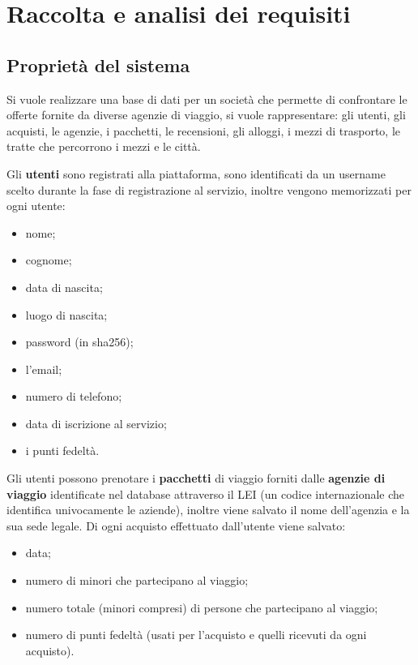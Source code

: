 \section{Raccolta e analisi dei requisiti}
\subsection{Proprietà del sistema}
%
%
Si vuole realizzare una base di dati per un società che permette di confrontare le offerte fornite da diverse agenzie di viaggio, si vuole rappresentare: gli utenti, gli acquisti, le agenzie, i pacchetti, le recensioni, gli alloggi, i mezzi di trasporto, le tratte che percorrono i mezzi e le città.

%
%
Gli \textbf{utenti} sono registrati alla piattaforma, sono identificati da un username scelto durante la fase di registrazione al servizio, inoltre vengono memorizzati per ogni utente:
\begin{multicols}{2}
\begin{itemize}
    \item nome;
    \item cognome;
    \item data di nascita;
    \item luogo di nascita;
    \item password (in sha256);
    \item l'email;
    \item numero di telefono;
    \item data di iscrizione al servizio;
    \item i punti fedeltà.
\end{itemize}
\end{multicols}
%
%
Gli utenti possono prenotare i \textbf{pacchetti} di viaggio forniti dalle \textbf{agenzie di viaggio} identificate nel database attraverso il LEI (un codice internazionale che identifica univocamente le aziende), inoltre viene salvato il nome dell'agenzia e la sua sede legale. Di ogni acquisto effettuato dall'utente viene salvato:
\begin{multicols}{2}
    \begin{itemize}
        \item data;
        \item numero di minori che partecipano al viaggio;
        \item numero totale (minori compresi) di persone che partecipano al viaggio;
        \item numero di punti fedeltà (usati per l'acquisto e quelli ricevuti da ogni acquisto).
     \end{itemize}
 \end{multicols}
